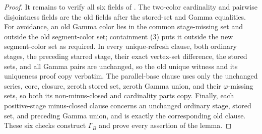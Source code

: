 \begin{proof}
It remains to verify all six fields of
.  The two-color cardinality and pairwise
disjointness fields are the old fields after the stored-set and Gamma
equalities.  For avoidance, an old Gamma color lies in the common
stage-missing set and outside the old segment-color set; containment
(3) puts it outside the new segment-color set as required.  In every
unique-refresh clause, both ordinary stages, the preceding starred
stage, their exact vertex-set difference, the stored sets, and all Gamma
pairs are unchanged, so the old unique witness and its uniqueness proof
copy verbatim.  The parallel-base clause uses only the unchanged series,
core, closure, zeroth stored set, zeroth Gamma union, and their
$\varphi$-missing sets, so both its non-minus-closed and cardinality
parts copy.  Finally, each positive-stage minus-closed clause concerns
an unchanged ordinary stage, stored set, and preceding Gamma union, and
is exactly the corresponding old clause.  These six checks construct
$\Gamma_B$ and prove every assertion of the lemma.
\end{proof}
